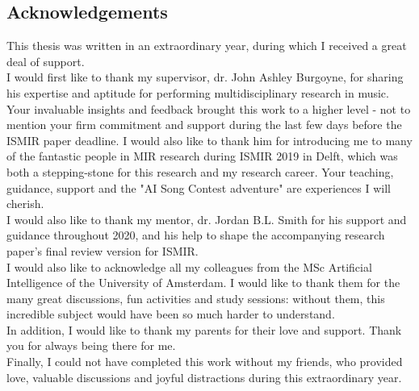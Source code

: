 
\begin{fullwidth}
    \section*{Acknowledgements}
    This thesis was written in an extraordinary year, during which I received a great deal of support.\\

    I would first like to thank my supervisor, dr. John Ashley Burgoyne, for sharing his expertise and aptitude for performing multidisciplinary research in music. Your invaluable insights and feedback brought this work to a higher level - not to mention your firm commitment and support during the last few days before the ISMIR paper deadline. I would also like to thank him for introducing me to many of the fantastic people in MIR research during ISMIR 2019 in Delft, which was both a stepping-stone for this research and my research career. Your teaching, guidance, support and the "AI Song Contest adventure" are experiences I will cherish.\\

    I would also like to thank my mentor, dr. Jordan B.L. Smith for his support and guidance throughout 2020, and his help to shape the accompanying research paper's final review version for ISMIR.\\

    I would also like to acknowledge all my colleagues from the MSc Artificial Intelligence of the University of Amsterdam. I would like to thank them for the many great discussions, fun activities and study sessions: without them, this incredible subject would have been so much harder to understand.\\

    In addition, I would like to thank my parents for their love and support. Thank you for always being there for me.\\
    
    Finally, I could not have completed this work without my friends, who provided love, valuable discussions and joyful distractions during this extraordinary year.\\
\end{fullwidth}
